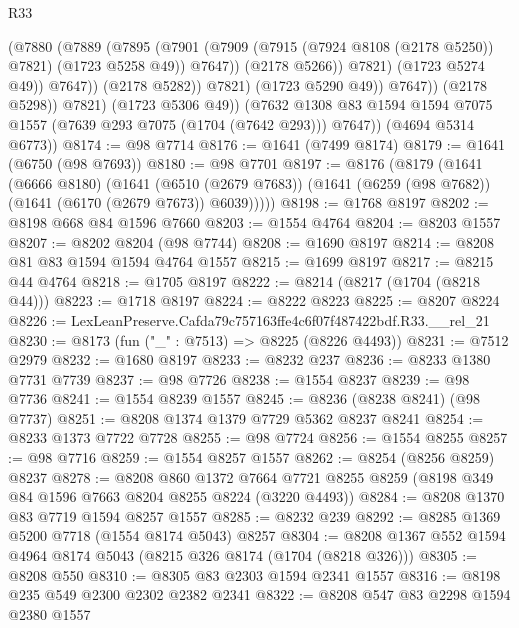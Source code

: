 \begin{lexlean}{R33}
\begin{coremodule}
                              (@7880
                                (@7889
                                  (@7895
                                    (@7901
                                      (@7909
                                        (@7915 (@7924 @8108 (@2178 @5250)) @7821)
                                        (@1723 @5258 @49))
                                      @7647))
                                  (@2178 @5266))
                                @7821)
                              (@1723 @5274 @49))
                            @7647))
                        (@2178 @5282))
                      @7821)
                    (@1723 @5290 @49))
                  @7647))
              (@2178 @5298))
            @7821)
          (@1723 @5306 @49))
        (@7632 @1308 @83 @1594 @1594 @7075 @1557 (@7639 @293 @7075 (@1704 (@7642 @293))) @7647))
      (@4694 @5314 @6773))
@8174 := @98 @7714
@8176 := @1641 (@7499 @8174)
@8179 := @1641 (@6750 (@98 @7693))
@8180 := @98 @7701
@8197 := @8176
    (@8179
      (@1641
        (@6666 @8180)
        (@1641
          (@6510 (@2679 @7683))
          (@1641 (@6259 (@98 @7682)) (@1641 (@6170 (@2679 @7673)) @6039)))))
@8198 := @1768 @8197
@8202 := @8198 @668 @84 @1596 @7660
@8203 := @1554 @4764
@8204 := @8203 @1557
@8207 := @8202 @8204 (@98 @7744)
@8208 := @1690 @8197
@8214 := @8208 @81 @83 @1594 @1594 @4764 @1557
@8215 := @1699 @8197
@8217 := @8215 @44 @4764
@8218 := @1705 @8197
@8222 := @8214 (@8217 (@1704 (@8218 @44)))
@8223 := @1718 @8197
@8224 := @8222 @8223
@8225 := @8207 @8224
@8226 := LexLeanPreserve.Cafda79c757163ffe4c6f07f487422bdf.R33.__rel_21
@8230 := @8173 (fun ("_" : @7513) => @8225 (@8226 @4493))
@8231 := @7512 @2979
@8232 := @1680 @8197
@8233 := @8232 @237
@8236 := @8233 @1380 @7731 @7739
@8237 := @98 @7726
@8238 := @1554 @8237
@8239 := @98 @7736
@8241 := @1554 @8239 @1557
@8245 := @8236 (@8238 @8241) (@98 @7737)
@8251 := @8208 @1374 @1379 @7729 @5362 @8237 @8241
@8254 := @8233 @1373 @7722 @7728
@8255 := @98 @7724
@8256 := @1554 @8255
@8257 := @98 @7716
@8259 := @1554 @8257 @1557
@8262 := @8254 (@8256 @8259) @8237
@8278 := @8208
    @860
    @1372
    @7664
    @7721
    @8255
    @8259
    (@8198 @349 @84 @1596 @7663 @8204 @8255 @8224 (@3220 @4493))
@8284 := @8208 @1370 @83 @7719 @1594 @8257 @1557
@8285 := @8232 @239
@8292 := @8285 @1369 @5200 @7718 (@1554 @8174 @5043) @8257
@8304 := @8208 @1367 @552 @1594 @4964 @8174 @5043 (@8215 @326 @8174 (@1704 (@8218 @326)))
@8305 := @8208 @550
@8310 := @8305 @83 @2303 @1594 @2341 @1557
@8316 := @8198 @235 @549 @2300 @2302 @2382 @2341
@8322 := @8208 @547 @83 @2298 @1594 @2380 @1557

\end{coremodule}
\end{lexlean}

